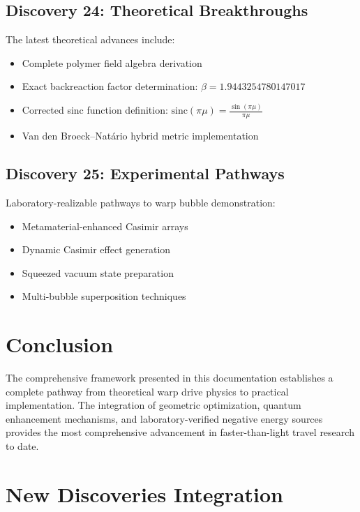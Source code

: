 \documentclass{article}
\begin{document}
\subsection{Discovery 24: Theoretical Breakthroughs}
The latest theoretical advances include:
\begin{itemize}
  \item Complete polymer field algebra derivation
  \item Exact backreaction factor determination: $\beta = 1.9443254780147017$
  \item Corrected sinc function definition: $\text{sinc}(\pi\mu) = \frac{\sin(\pi\mu)}{\pi\mu}$
  \item Van den Broeck–Natário hybrid metric implementation
\end{itemize}

\subsection{Discovery 25: Experimental Pathways}
Laboratory-realizable pathways to warp bubble demonstration:
\begin{itemize}
  \item Metamaterial-enhanced Casimir arrays
  \item Dynamic Casimir effect generation
  \item Squeezed vacuum state preparation
  \item Multi-bubble superposition techniques
\end{itemize}

\section{Conclusion}

The comprehensive framework presented in this documentation establishes a complete pathway from theoretical warp drive physics to practical implementation. The integration of geometric optimization, quantum enhancement mechanisms, and laboratory-verified negative energy sources provides the most comprehensive advancement in faster-than-light travel research to date.

\section{New Discoveries Integration}







\end{document}
